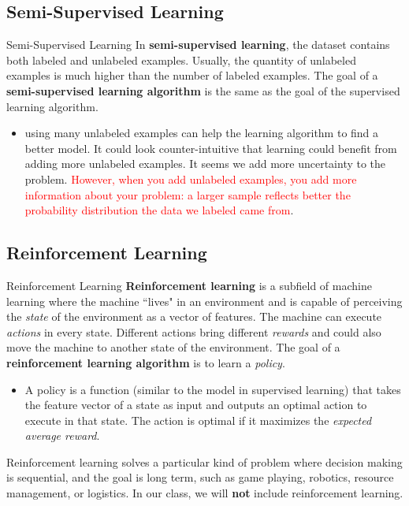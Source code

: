 \documentclass[10pt,dvipsnames]{beamer}
\begin{document}
\subsection{Semi-Supervised Learning}
\begin{frame}{Semi-Supervised Learning}
    In \textbf{semi-supervised learning}, the dataset contains both labeled and unlabeled examples. Usually, the quantity of unlabeled examples is much higher than the number of labeled examples. The goal of a \textbf{semi-supervised learning algorithm} is the same as the goal of the supervised learning algorithm.
    \begin{itemize}
        \item using many unlabeled examples can help the learning algorithm to find a better model. It could look counter-intuitive that learning could benefit from adding more unlabeled examples. It seems we add more uncertainty to the problem. \textcolor{red}{However, when you add unlabeled examples, you add more information about your problem: a larger sample reflects better the probability distribution the data we labeled came from}.
    \end{itemize}
\end{frame}

\subsection{Reinforcement Learning}
\begin{frame}{Reinforcement Learning}
    \textbf{Reinforcement learning} is a subfield of machine learning where the machine ``lives" in an environment and is capable of perceiving the \textit{state} of the environment as a vector of features. The machine can execute \textit{actions} in every state. Different actions bring different \textit{rewards} and could also move the machine to another state of the environment.  The goal of a \textbf{reinforcement learning algorithm} is to learn a \textit{policy}.
    \begin{itemize}
        \item A policy is a function (similar to the model in supervised learning) that takes the feature vector of a state as input and outputs an optimal action to execute in that state. The action is optimal if it maximizes the \textit{expected average reward}.
    \end{itemize}
    Reinforcement learning solves a particular kind of problem where decision making is sequential, and the goal is long term, such as game playing, robotics, resource management, or logistics. In our class, we will \textbf{not} include reinforcement learning.
\end{frame}
\end{document}
